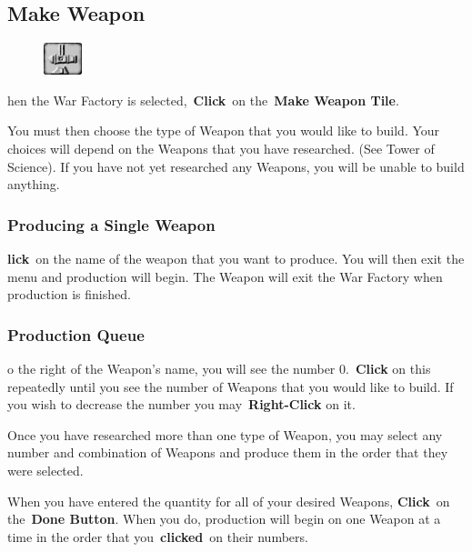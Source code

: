 \subsection{Make Weapon}


\begin{figure}
	\vspace{-20pt}
	\begin{center}
		\includegraphics[width=0.1\textwidth]{Tweaponmake}
	\end{center}
	\vspace{-20pt}
\end{figure}

hen the War Factory is selected, \textbf{Click} on the \textbf{Make Weapon Tile}.

You must then choose the type of Weapon that you would like to build. Your choices will depend on the Weapons that you have researched. (See Tower of Science). If you have not yet researched any Weapons, you will be unable to build anything.

\subsubsection{Producing a Single Weapon}

\textbf{lick} on the name of the weapon that you want to produce. You will then exit the menu and production will begin. The Weapon will exit the War Factory when production is finished.

\subsubsection{Production Queue}

o the right of the Weapon’s name, you will see the number 0. \textbf{Click} on this repeatedly until you see the number of Weapons that you would like to build. If you wish to decrease the number you may \textbf{Right-Click} on it.

Once you have researched more than one type of Weapon, you may select any number and combination of Weapons and produce them in the order that they were selected.

When you have entered the quantity for all of your desired Weapons, \textbf{Click} on the \textbf{Done Button}. When you do, production will begin on one Weapon at a time in the order that you \textbf{clicked} on their numbers.

